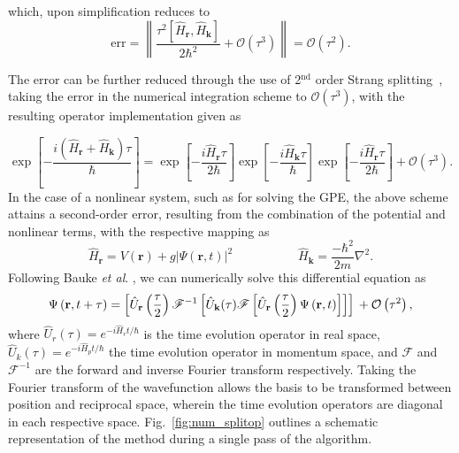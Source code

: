 which, upon simplification reduces to
\begin{equation}
\text{err} = \left\| \frac{\tau^2[{\hat{H}_{\textbf{r}}},{\hat{H}_{\textbf{k}}}]}{2\hbar^2} + \mathcal{O}(\tau^3)\right\| = \mathcal{O}(\tau^2).
\end{equation}

The error can be further reduced through the use of 2$^{\text{nd}}$ order Strang splitting~\cite{NUM:Gradinaru_SIAM_2007}, taking the error in the numerical integration scheme to $\mathcal{O}(\tau^3)$, with the resulting operator implementation given as

\begin{equation}\label{eqn:3}
\exp\left[ -\frac{ i\left(\hat{H}_{\textbf{r}} + \hat{H}_{\textbf{k}}\right)\tau}{\hbar} \right] = \exp\left[- \frac{i\hat{H}_{\textbf{r}}\tau}{2\hbar} \right]\exp\left[-\frac{i\hat{H}_{\textbf{k}}\tau}{\hbar}\right]\exp\left[ -\frac{i\hat{H}_{\textbf{r}}\tau}{2\hbar}\right] + \mathcal{O}\left(\tau^3\right).
\end{equation}
In the case of a nonlinear system, such as for solving the GPE, the above scheme attains a second-order error, resulting from the combination of the potential and nonlinear terms, with the respective mapping as \cite{BEC:Javanainen_jphysa_2006}
\begin{equation}
\hat{H}_{\textbf{r}} = V(\mathbf{r}) + g\vert\Psi(\mathbf{r},t)\vert^2\; \hspace{5em} \hat{H}_{\textbf{k}} = \frac{-\hbar^2}{2m}\nabla^2.
\end{equation}
Following Bauke \textit{et al}. \cite{Num:Bauke_cpc_2011}, we can numerically solve this differential equation as
\begin{equation}
\Psi\left(\textbf{r},t+\tau\right) = \left[\hat{U}_{\mathbf{r}}\left(\frac{\tau}{2}\right) \mathscr{F}^{-1} \left[ \hat{U}_{\mathbf{k}}(\tau) \mathscr{F} \left[ \hat{U}_{\mathbf{r}}\left(\frac{\tau}{2}\right) \Psi\left(\mathbf{r},t\right) \right] \right] \right]  \\ + \mathcal{O}\left(\tau^2\right),
\end{equation}
where $\hat{U}_{r}(\tau)=e^{-i\hat{H}_{r}t/\hbar}$ is the time evolution operator in real space, $\hat{U}_{k}(\tau)=e^{-i\hat{H}_{p}t/\hbar}$ the time evolution operator in momentum space, and $\mathscr{F}$ and $\mathscr{F}^{-1}$ are the forward and inverse Fourier transform respectively. Taking the Fourier transform of the wavefunction allows the basis to be transformed between position and reciprocal space, wherein the time evolution operators are diagonal in each respective space. Fig.~\ref{fig:num_splitop} outlines a schematic representation of the method during a single pass of the algorithm.

